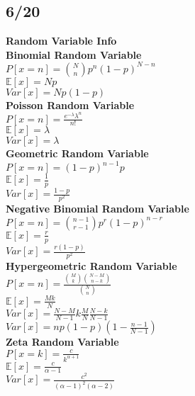 \documentclass{article}
\begin{document}
\subsection*{6/20}
\textbf{Random Variable Info}\\
\textbf{Binomial Random Variable}\\
$P[x=n] = \binom{N}{n}p^n(1-p)^{N-n}$\\
$\mathbb{E}[x] = Np$\\
$Var[x] = Np(1-p)$\\
\textbf{Poisson Random Variable}\\
$P[x=n] = \frac{e^{-\lambda}\lambda^n}{n!}$\\
$\mathbb{E}[x] = \lambda$\\
$Var[x] = \lambda$\\
\textbf{Geometric Random Variable}\\
$P[x=n] = (1-p)^{n-1}p$\\
$\mathbb{E}[x] = \frac{1}{p}$\\
$Var[x] = \frac{1-p}{p^2}$\\
\textbf{Negative Binomial Random Variable}\\
$P[x=n] = \binom{n-1}{r-1}p^r(1-p)^{n-r}$\\
$\mathbb{E}[x] = \frac{r}{p}$\\
$Var[x] = \frac{r(1-p)}{p^2}$\\
\textbf{Hypergeometric Random Variable}\\
$P[x=n] = \frac{\binom{M}{k}\binom{N-M}{n-k}}{\binom{N}{n}}$\\
$\mathbb{E}[x] = \frac{Mk}{N}$\\
$Var[x] = \frac{N-M}{N-1}k\frac{M}{N}\frac{N-k}{N-1}$\\
$Var[x] = np(1-p)(1-\frac{n-1}{N-1})$\\
\textbf{Zeta Random Variable}\\
$P[x=k] = \frac{c}{k^{\alpha + 1}}$\\
$\mathbb{E}[x] = \frac{c}{\alpha - 1}$\\
$Var[x] = \frac{c^2}{(\alpha - 1)^2(\alpha - 2)}$\\
\end{document}
